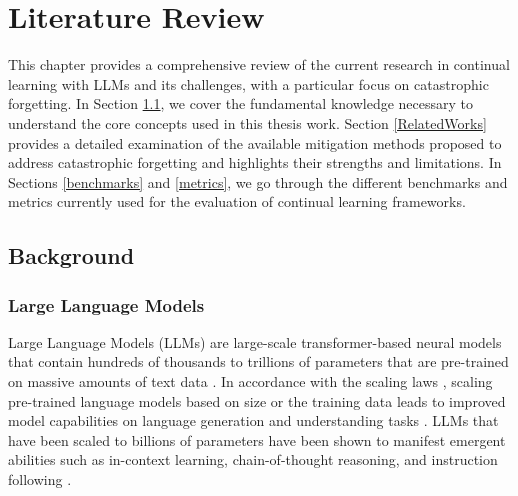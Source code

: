 
\chapter{Literature Review} 
\label{LiteratureReview} %

This chapter provides a comprehensive review of the current research in continual learning with LLMs and its challenges, with a particular focus on catastrophic forgetting. In Section \ref{background}, we cover the fundamental knowledge necessary to understand the core concepts used in this thesis work. Section \ref{RelatedWorks} provides a detailed examination of the available mitigation methods proposed to address catastrophic forgetting and highlights their strengths and limitations. In Sections \ref{benchmarks} and \ref{metrics}, we go through the different benchmarks and metrics currently used for the evaluation of continual learning frameworks.


\section{Background} \label{background}

\subsection{Large Language Models}
Large Language Models (LLMs) are large-scale transformer-based neural models that contain hundreds of thousands to trillions of parameters that are pre-trained on massive amounts of text data \cite{minaee2024large}. In accordance with the scaling laws \cite{kaplan2020scaling}, scaling pre-trained language models based on size or the training data leads to improved model capabilities on language generation and understanding tasks \cite{zhao2023survey}. LLMs that have been scaled to billions of parameters have been shown to manifest emergent abilities such as in-context learning, chain-of-thought reasoning, and instruction following \cite{shi2024continual}. 

